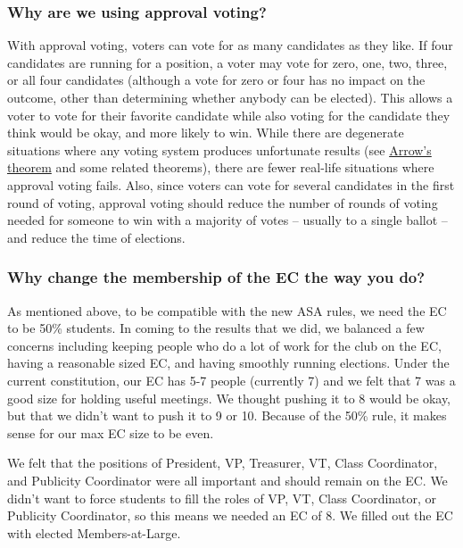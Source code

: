 \documentclass{article}
\begin{document}
\subsubsection*{Why are we using approval voting?}
With approval voting, voters can vote for as many candidates as they like. If four candidates are running for a position, a voter may vote for zero, one, two, three, or all four candidates (although a vote for zero or four has no impact on the outcome, other than determining whether anybody can be elected). This allows a voter to vote for their favorite candidate while also voting for the candidate they think would be okay, and more likely to win. While there are degenerate situations where any voting system produces unfortunate results (see \href{http://en.wikipedia.org/wiki/Arrow's_impossibility_theorem}{Arrow's theorem} and some related theorems), there are fewer real-life situations where approval voting fails. Also, since voters can vote for several candidates in the first round of voting, approval voting should reduce the number of rounds of voting needed for someone to win with a majority of votes -- usually to a single ballot -- and reduce the time of elections.

\subsubsection*{Why change the membership of the EC the way you do?}
As mentioned above, to be compatible with the new ASA rules, we need the EC to be 50\% students. In coming to the results that we did, we balanced a few concerns including keeping people who do a lot of work for the club on the EC, having a reasonable sized EC, and having smoothly running elections. Under the current constitution, our EC has 5-7 people (currently 7) and we felt that 7 was a good size for holding useful meetings. We thought pushing it to 8 would be okay, but that we didn't want to push it to 9 or 10. Because of the 50\% rule, it makes sense for our max EC size to be even.

We felt that the positions of President, VP, Treasurer, VT, Class Coordinator, and Publicity Coordinator were all important and should remain on the EC. We didn't want to force students to fill the roles of VP, VT, Class Coordinator, or Publicity Coordinator, so this means we needed an EC of 8. We filled out the EC with elected  Members-at-Large.
\end{document}
